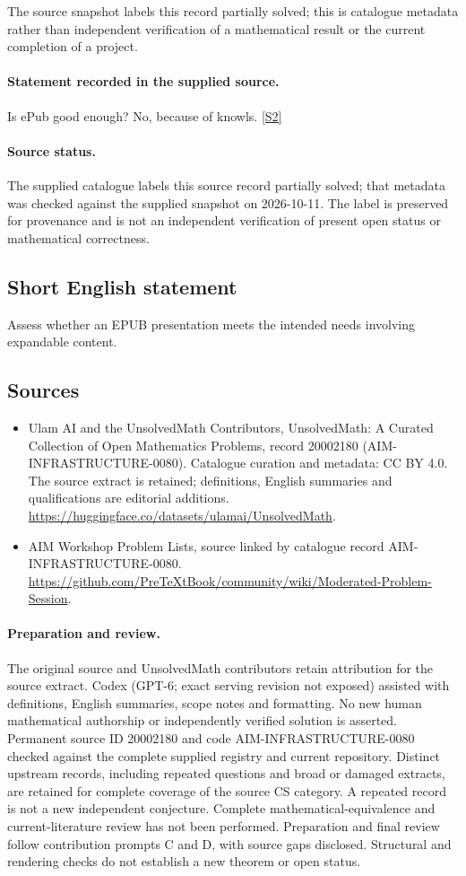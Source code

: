\documentclass[11pt]{article}
\begin{document}
The source snapshot labels this record partially solved; this is catalogue metadata rather than independent verification of a mathematical result or the current completion of a project.
\paragraph{Statement recorded in the supplied source.}
Is ePub good enough? No, because of knowls. \href{https://github.com/PreTeXtBook/community/wiki/Moderated-Problem-Session}{[S2]}
\paragraph{Source status.}
The supplied catalogue labels this source record partially solved; that metadata was checked against the supplied snapshot on 2026-10-11. The label is preserved for provenance and is not an independent verification of present open status or mathematical correctness.
\subsection{Short English statement}
Assess whether an EPUB presentation meets the intended needs involving expandable content.
\subsection{Sources}
\begin{itemize}
\item[S1] Ulam AI and the UnsolvedMath Contributors, UnsolvedMath: A Curated Collection of Open Mathematics Problems, record 20002180 (AIM-INFRASTRUCTURE-0080). Catalogue curation and metadata: CC BY 4.0. The source extract is retained; definitions, English summaries and qualifications are editorial additions.
\url{https://huggingface.co/datasets/ulamai/UnsolvedMath}.
\item[S2] AIM Workshop Problem Lists, source linked by catalogue record AIM-INFRASTRUCTURE-0080.
\url{https://github.com/PreTeXtBook/community/wiki/Moderated-Problem-Session}.
\end{itemize}
\paragraph{Preparation and review.}
The original source and UnsolvedMath contributors retain attribution for the source extract. Codex (GPT-6; exact serving revision not exposed) assisted with definitions, English summaries, scope notes and formatting. No new human mathematical authorship or independently verified solution is asserted. Permanent source ID 20002180 and code AIM-INFRASTRUCTURE-0080 checked against the complete supplied registry and current repository. Distinct upstream records, including repeated questions and broad or damaged extracts, are retained for complete coverage of the source CS category. A repeated record is not a new independent conjecture. Complete mathematical-equivalence and current-literature review has not been performed. Preparation and final review follow contribution prompts C and D, with source gaps disclosed. Structural and rendering checks do not establish a new theorem or open status.
\label{end:20002180}
\end{document}
